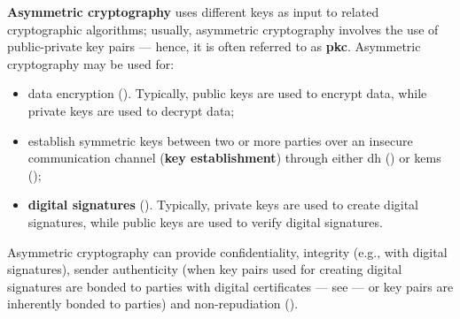 \textbf{Asymmetric cryptography} uses different keys as input to related cryptographic algorithms; usually, asymmetric cryptography involves the use of public-private key pairs --- hence, it is often referred to as \textbf{\gls{pkc}}. Asymmetric cryptography may be used for:

\begin{itemize}
	\item data encryption (). Typically, public keys are used to encrypt data, while private keys are used to decrypt data;
	\item establish symmetric keys between two or more parties over an insecure communication channel (\textbf{key establishment}) through either \gls{dh} () or \glspl{kem} ();
	\item \textbf{digital signatures} (). Typically, private keys are used to create digital signatures, while public keys are used to verify digital signatures.
\end{itemize}

Asymmetric cryptography can provide confidentiality, integrity (e.g., with digital signatures), sender authenticity (when key pairs used for creating digital signatures are bonded to parties with digital certificates --- see  --- or key pairs are inherently bonded to parties)
and non-repudiation (). 

